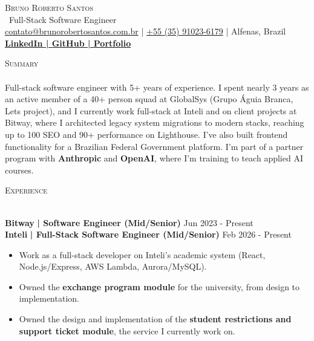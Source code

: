 \documentclass[a4paper]{article}
\newcommand{\lineunder}{
    \vspace*{-8pt} \\
    \hspace*{-18pt} \hrulefill \\
}
\newcommand{\header}[1]{
    {\hspace*{-18pt}\vspace*{6pt} \textsc{#1}}
    \vspace*{-6pt} \lineunder
}
\begin{document}
    \vspace*{-40pt}

    \vspace*{-2pt}
    \begin{center}
        {\Huge \scshape {Bruno Roberto Santos}}\\
        \vspace*{2pt}
        \ {Full-Stack Software Engineer}\\
        \vspace*{2pt}
        \href{mailto:contato@brunorobertosantos.com.br}{contato@brunorobertosantos.com.br} | \href{tel:+5535910236179}{+55 (35) 91023-6179} | Alfenas, Brazil\\
        \vspace*{4pt}
        \textbf{\href{https://www.linkedin.com/in/rsbruno/}{LinkedIn | }}\textbf{\href{https://github.com/rsbruno}{GitHub | }}\textbf{\href{https://brunorobertosantos.com.br/}{Portfolio}}\\
    \end{center}

    \header{Summary}
    \vspace{2mm}
Full-stack software engineer with 5+ years of experience. I spent nearly 3 years as an active member of a 40+ person squad at GlobalSys (Grupo \'Aguia Branca, Lets project), and I currently work full-stack at Inteli and on client projects at Bitway, where I architected legacy system migrations to modern stacks, reaching up to 100 SEO and 90+ performance on Lighthouse. I've also built frontend functionality for a Brazilian Federal Government platform. I'm part of a partner program with \textbf{Anthropic} and \textbf{OpenAI}, where I'm training to teach applied AI courses.
    \vspace{2mm}

    \header{Experience}
    \vspace{2mm}

    \textbf{Bitway}\textbf{ | Software Engineer (Mid/Senior)} \hfill  Jun 2023 - Present\\
    \textbf{Inteli}\textbf{ | Full-Stack Software Engineer (Mid/Senior)} \hfill  Feb 2026 - Present\\
    \vspace{-3mm}
    \begin{itemize} \itemsep -3pt
        \item Work as a full-stack developer on Inteli's academic system (React, Node.js/Express, AWS Lambda, Aurora/MySQL).
        \item Owned the \textbf{exchange program module} for the university, from design to implementation.
        \item Owned the design and implementation of the \textbf{student restrictions and support ticket module}, the service I currently work on.
    \end{itemize}
\end{document}
